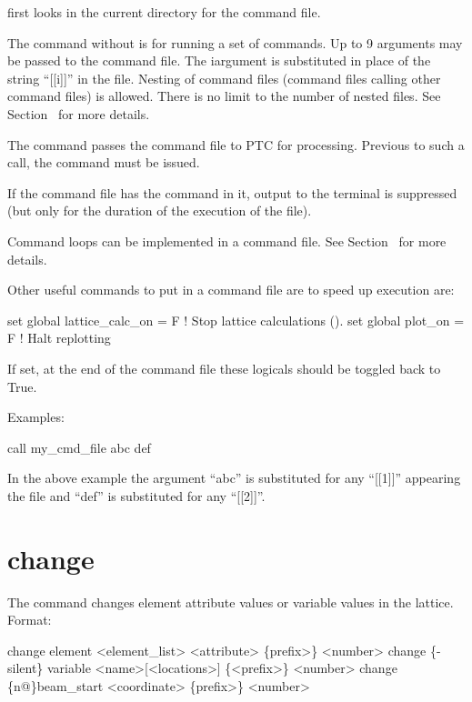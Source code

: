 \vskip 10pt 
\tao first looks in the current directory for the command file.

The  command without  is for running a set of \tao commands.  Up to 9
arguments may be passed to the command file. The i\Th argument is substituted in place of
the string ``[[i]]'' in the file. Nesting of command files (command files calling other
command files) is allowed. There is no limit to the number of nested files.  See
Section~ for more details.

The  command passes the command file to PTC for processing. Previous to such
a call, the command  must be issued.

If the command file has the  command in it, output to the terminal is suppressed (but
only for the duration of the execution of the file).

Command loops can be implemented in a command file. See Section~ for more details.

Other useful commands to put in a command file are to speed up execution are:
\begin{example}
  set global lattice_calc_on = F   ! Stop lattice calculations ().
  set global plot_on = F           ! Halt replotting
\end{example}
If set, at the end of the command file these logicals should be toggled back to True.

Examples:
\begin{example}
    call my_cmd_file abc def 
\end{example}
In the above example the argument ``abc'' is substituted for any ``[[1]]'' appearing the
file and ``def'' is substituted for any ``[[2]]''.  \Newline

\section{change}
\label{s:change}

The  command changes element attribute values or variable values in the
 lattice. Format:
\begin{example}
  change element <element_list> <attribute> \{prefix>\} <number>
  change \{-silent\} variable <name>[<locations>] \{<prefix>\} <number>
  change  \{n@\}beam_start <coordinate> \{prefix>\} <number>
\end{example}

